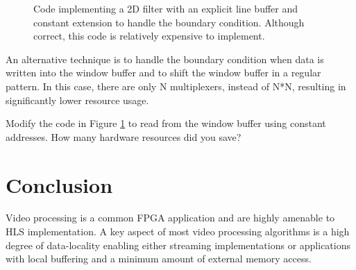\begin{figure}
{\tiny }
\caption{Code implementing a 2D filter with an explicit line buffer and constant extension to handle the boundary condition.   Although correct, this code is relatively expensive to implement.}\label{fig:video:boundaryConditionExtendBad}
\end{figure}

An alternative technique is to handle the boundary condition when data is written into the window buffer and to shift the window buffer in a regular pattern.  In this case, there are only N multiplexers, instead of N*N, resulting in significantly lower resource usage.  

\begin{exercise}
Modify the code in Figure \ref{fig:video:boundaryConditionExtendBad} to read from the window buffer using constant addresses.  How many hardware resources did you save?
\end{exercise}


\section{Conclusion}

Video processing is a common FPGA application and are highly amenable to HLS implementation.  A key aspect of most video processing algorithms is a high degree of data-locality enabling either streaming implementations or applications with local buffering and a minimum amount of external memory access.

